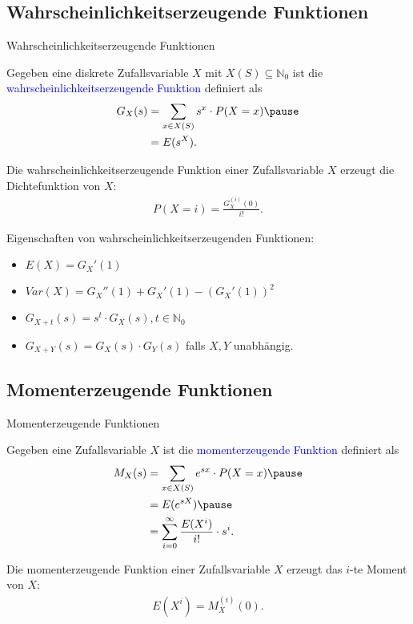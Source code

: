 \documentclass{beamer}
\def\padding{\vspace{0.5cm}}
\def\b{\textcolor{blue}}
\begin{document}
\subsection{Wahrscheinlichkeitserzeugende Funktionen}
\begin{frame}{Wahrscheinlichkeitserzeugende Funktionen}
    \begin{definition}
        Gegeben eine diskrete Zufallsvariable $X$ mit $X(S) \subseteq \mathbb{N}_0$ ist die \b{wahrscheinlichkeitserzeugende Funktion} definiert als
        \begin{align*}
            G_X(s) &= \sum_{x \in X(S)} s^x \cdot P(X=x)\pause \\
                   &= E(s^X).
        \end{align*}
    \end{definition}\pause\par\padding
    Die wahrscheinlichkeitserzeugende Funktion einer Zufallsvariable $X$ erzeugt die Dichtefunktion von $X$:
    \begin{align*}
        P(X = i) = \frac{G_X^{(i)}(0)}{i!}.
    \end{align*}
\end{frame}

\begin{frame}
    Eigenschaften von wahrscheinlichkeitserzeugenden Funktionen:\pause
    \begin{itemize}
        \item $E(X) = G_X'(1)$\pause
        \item $Var(X) = G_X''(1) + G_X'(1) - (G_X'(1))^2$\pause
        \item $G_{X + t}(s) = s^t \cdot G_X(s), t \in \mathbb{N}_0$\pause
        \item $G_{X + Y}(s) = G_X(s) \cdot G_Y(s)$ falls $X,Y$ unabhängig.
    \end{itemize}
\end{frame}

\subsection{Momenterzeugende Funktionen}
\begin{frame}{Momenterzeugende Funktionen}
    \begin{definition}
       Gegeben eine Zufallsvariable $X$ ist die \b{momenterzeugende Funktion} definiert als
        \begin{align*}
            M_X(s) &= \sum_{x \in X(S)} e^{s x} \cdot P(X=x)\pause \\
                   &= E(e^{s X})\pause \\
                   &= \sum_{i=0}^{\infty} \frac{E(X^i)}{i!} \cdot s^i.
        \end{align*}
    \end{definition}\pause\par\padding
    Die momenterzeugende Funktion einer Zufallsvariable $X$ erzeugt das $i$-te Moment von $X$:
    \begin{align*}
        E(X^i) = M_X^{(i)}(0).
    \end{align*}
\end{frame}
\end{document}
